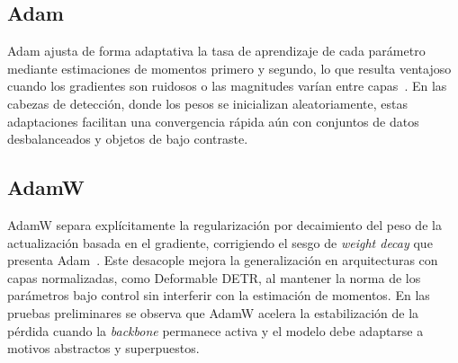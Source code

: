 \subsection*{Adam}
Adam ajusta de forma adaptativa la tasa de aprendizaje de cada parámetro mediante estimaciones de momentos primero y segundo, lo que resulta ventajoso cuando los gradientes son ruidosos o las magnitudes varían entre capas~\cite{kingma2015adam}.
En las cabezas de detección, donde los pesos se inicializan aleatoriamente, estas adaptaciones facilitan una convergencia rápida aún con conjuntos de datos desbalanceados y objetos de bajo contraste.

\subsection*{AdamW}
AdamW separa explícitamente la regularización por decaimiento del peso de la actualización basada en el gradiente, corrigiendo el sesgo de \emph{weight decay} que presenta Adam~\cite{loshchilov2019adamw}.
Este desacople mejora la generalización en arquitecturas con capas normalizadas, como Deformable DETR, al mantener la norma de los parámetros bajo control sin interferir con la estimación de momentos.
En las pruebas preliminares se observa que AdamW acelera la estabilización de la pérdida cuando la \emph{backbone} permanece activa y el modelo debe adaptarse a motivos abstractos y superpuestos.

